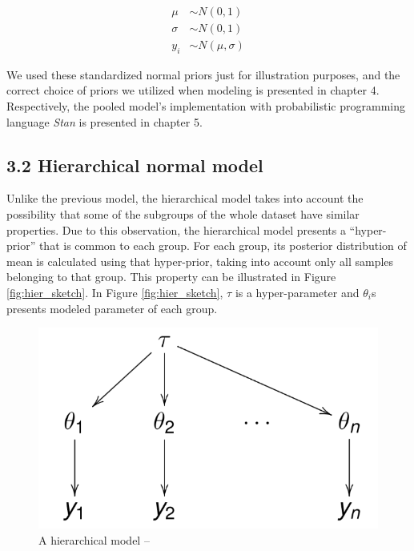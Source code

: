 \documentclass[
]{article}
\begin{document}
\begin{align}\label{eq1}
     \mu & \sim N(0,1) \\
     \sigma & \sim N(0,1) \\
     y_i & \sim N(\mu,\sigma)
\end{align}

We used these standardized normal priors just for illustration purposes,
and the correct choice of priors we utilized when modeling is presented
in chapter 4. Respectively, the pooled model's implementation with
probabilistic programming language \emph{Stan} is presented in chapter
5.

\hypertarget{hierarchical-normal-model}{%
\subsection{3.2 Hierarchical normal
model}\label{hierarchical-normal-model}}

Unlike the previous model, the hierarchical model takes into account the
possibility that some of the subgroups of the whole dataset have similar
properties. Due to this observation, the hierarchical model presents a
``hyper-prior'' that is common to each group. For each group, its
posterior distribution of mean is calculated using that hyper-prior,
taking into account only all samples belonging to that group. This
property can be illustrated in Figure \ref{fig:hier_sketch}. In Figure
\ref{fig:hier_sketch}, \(\tau\) is a hyper-parameter and \(\theta_i\)s
presents modeled parameter of each group.

\begin{figure}
\includegraphics[width=1\linewidth]{hier_model} \caption{\label{fig:hier_sketch}A hierarchical model -- }\label{fig:hier}
\end{figure}
\end{document}
